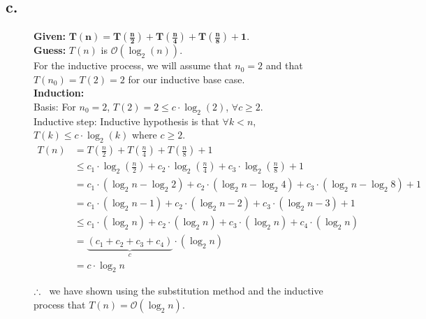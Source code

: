 \documentclass{article}
\begin{document}
        \newpage

        \subsection*{c.}

            \begin{figure}[!ht]
                
                \centering
                \begin{minipage}{0.9\textwidth}
                    \textbf{Given:} $\mathbf{T(n) = T\left(\frac{n}{2}\right) + T\left(\frac{n}{4}\right) + T\left(\frac{n}{8}\right) + 1}$.\\
                    \textbf{Guess:} $T(n)$ is $\mathcal{O}(\log_{2}(n))$.\\
                    
                    For the inductive process, we will assume that $n_{0} = 2$ and that $T(n_{0}) = T(2) = 2$ for our inductive base case.\\
                    
                    \textbf{Induction:}\\
                    \hspace*{10pt} Basis: For $n_{0} = 2$, $T(2) = 2 \leq c \cdot \log_{2}(2)$, $\forall c \geq 2$.\\
                    \hspace*{10pt} Inductive step: Inductive hypothesis is that $\forall k < n$, $T(k) \leq c \cdot \log_{2}(k)$ where $c \geq 2$.
                    \begin{align*}
                        T(n) &= T\left(\frac{n}{2}\right) + T\left(\frac{n}{4}\right) + T\left(\frac{n}{8}\right) + 1\\
                             &\leq c_{1} \cdot \log_{2}\left(\frac{n}{2}\right) + c_{2} \cdot \log_{2}\left(\frac{n}{4}\right) + c_{3} \cdot \log_{2}\left(\frac{n}{8}\right) + 1\\
                             &= c_{1} \cdot (\log_{2}n - \log_{2}2) + c_{2} \cdot (\log_{2}n - \log_{2}4) + c_{3} \cdot (\log_{2}n - \log_{2}8) + 1\\
                             &= c_{1} \cdot (\log_{2}n - 1) + c_{2} \cdot (\log_{2}n - 2) + c_{3} \cdot (\log_{2}n - 3) + 1\\
                             &\leq c_{1} \cdot (\log_{2}n) + c_{2} \cdot (\log_{2}n) + c_{3} \cdot (\log_{2}n) + c_{4} \cdot (\log_{2}n)\\
                             &= \underbrace{(c_{1} + c_{2} + c_{3} + c_{4})}_{c} \cdot (\log_{2}n)\\
                             &= c \cdot \log_{2}n
                    \end{align*}

                    $\therefore \hspace*{5pt}$ we have shown using the substitution method and the inductive process that $T(n) = \mathcal{O}(\log_{2}n)$.
                \end{minipage}

            \end{figure}
        
\end{document}
